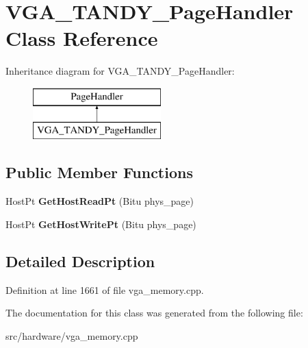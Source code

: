 \hypertarget{classVGA__TANDY__PageHandler}{\section{V\-G\-A\-\_\-\-T\-A\-N\-D\-Y\-\_\-\-Page\-Handler Class Reference}
\label{classVGA__TANDY__PageHandler}
}
Inheritance diagram for V\-G\-A\-\_\-\-T\-A\-N\-D\-Y\-\_\-\-Page\-Handler\-:\begin{figure}[H]
\begin{center}
\leavevmode
\includegraphics[height=2.000000cm]{classVGA__TANDY__PageHandler}
\end{center}
\end{figure}
\subsection*{Public Member Functions}
\begin{DoxyCompactItemize}
\item 
\hypertarget{classVGA__TANDY__PageHandler_a8c39c6f07a7c47fa66839f49dbac7585}{Host\-Pt {\bfseries Get\-Host\-Read\-Pt} (Bitu phys\-\_\-page)}\label{classVGA__TANDY__PageHandler_a8c39c6f07a7c47fa66839f49dbac7585}

\item 
\hypertarget{classVGA__TANDY__PageHandler_aa7f32d214017a07179bc6b8187028e69}{Host\-Pt {\bfseries Get\-Host\-Write\-Pt} (Bitu phys\-\_\-page)}\label{classVGA__TANDY__PageHandler_aa7f32d214017a07179bc6b8187028e69}

\end{DoxyCompactItemize}


\subsection{Detailed Description}


Definition at line 1661 of file vga\-\_\-memory.\-cpp.



The documentation for this class was generated from the following file\-:\begin{DoxyCompactItemize}
\item 
src/hardware/vga\-\_\-memory.\-cpp\end{DoxyCompactItemize}
